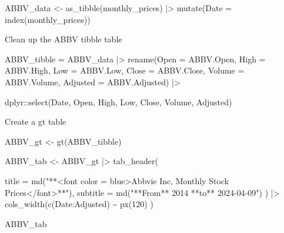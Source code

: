 \documentclass[
  letterpaper,
  DIV=11,
  numbers=noendperiod]{scrartcl}
\newenvironment{Shaded}{\begin{snugshade}}{\end{snugshade}}
\newcommand{\AttributeTok}[1]{\textcolor[rgb]{0.40,0.45,0.13}{#1}}
\newcommand{\DecValTok}[1]{\textcolor[rgb]{0.68,0.00,0.00}{#1}}
\newcommand{\FunctionTok}[1]{\textcolor[rgb]{0.28,0.35,0.67}{#1}}
\newcommand{\NormalTok}[1]{\textcolor[rgb]{0.00,0.23,0.31}{#1}}
\newcommand{\OtherTok}[1]{\textcolor[rgb]{0.00,0.23,0.31}{#1}}
\newcommand{\SpecialCharTok}[1]{\textcolor[rgb]{0.37,0.37,0.37}{#1}}
\newcommand{\StringTok}[1]{\textcolor[rgb]{0.13,0.47,0.30}{#1}}
\begin{document}
\begin{Shaded}
\begin{Highlighting}[]
\NormalTok{ABBV\_data }\OtherTok{\textless{}{-}} \FunctionTok{as\_tibble}\NormalTok{(monthly\_prices) }\SpecialCharTok{|\textgreater{}}
  \FunctionTok{mutate}\NormalTok{(}\AttributeTok{Date =} \FunctionTok{index}\NormalTok{(monthly\_prices))}
\end{Highlighting}
\end{Shaded}

Clean up the ABBV tibble table

\begin{Shaded}
\begin{Highlighting}[]
\NormalTok{ABBV\_tibble }\OtherTok{=}\NormalTok{ ABBV\_data }\SpecialCharTok{|\textgreater{}}
  \FunctionTok{rename}\NormalTok{(}\AttributeTok{Open =}\NormalTok{ ABBV.Open,}
        \AttributeTok{High =}\NormalTok{ ABBV.High,}
        \AttributeTok{Low =}\NormalTok{ ABBV.Low,}
        \AttributeTok{Close =}\NormalTok{ ABBV.Close,}
        \AttributeTok{Volume =}\NormalTok{ ABBV.Volume,}
        \AttributeTok{Adjusted =}\NormalTok{ ABBV.Adjusted) }\SpecialCharTok{|\textgreater{}}

\NormalTok{dplyr}\SpecialCharTok{::}\FunctionTok{select}\NormalTok{(Date, Open, High, Low, Close, Volume, Adjusted)}
\end{Highlighting}
\end{Shaded}

Create a gt table

\begin{Shaded}
\begin{Highlighting}[]
\NormalTok{ABBV\_gt }\OtherTok{\textless{}{-}} \FunctionTok{gt}\NormalTok{(ABBV\_tibble) }

\NormalTok{ABBV\_tab }\OtherTok{\textless{}{-}}\NormalTok{ ABBV\_gt }\SpecialCharTok{|\textgreater{}}
 \FunctionTok{tab\_header}\NormalTok{(}
  
    \AttributeTok{title =} \FunctionTok{md}\NormalTok{(}\StringTok{"**\textless{}font color = blue\textgreater{}Abbvie Inc, Monthly Stock Prices\textless{}/font\textgreater{}**"}\NormalTok{),}
    \AttributeTok{subtitle =} \FunctionTok{md}\NormalTok{(}\StringTok{"**From** 2014 **to** 2024{-}04{-}09"}\NormalTok{)}
\NormalTok{ ) }\SpecialCharTok{|\textgreater{}} 
 \FunctionTok{cols\_width}\NormalTok{(}\FunctionTok{c}\NormalTok{(Date}\SpecialCharTok{:}\NormalTok{Adjusted)  }\SpecialCharTok{\textasciitilde{}} \FunctionTok{px}\NormalTok{(}\DecValTok{120}\NormalTok{)}
\NormalTok{  )}

\NormalTok{ABBV\_tab}
\end{Highlighting}
\end{Shaded}
\end{document}
